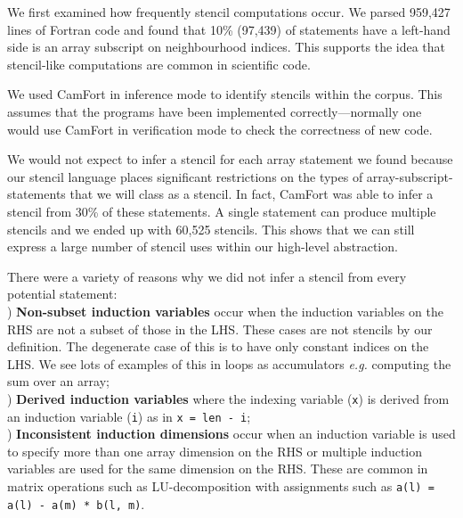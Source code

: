 \documentclass[10pt,preprint,numbers]{sigplanconf}
\theoremstyle{definition}
\newcommand{\eg}{\emph{e.g.}}
\begin{document}
We first examined how frequently stencil computations occur. We parsed
959,427 lines of Fortran code and found that 10\% (97,439) of
statements have a left-hand side is an array subscript on
neighbourhood indices. This supports the idea that stencil-like
computations are common in scientific code.

We used CamFort in inference mode to identify stencils within the
corpus. This assumes that the programs have been implemented
correctly---normally one would use CamFort in verification mode to
check the correctness of new code.

We would not expect to infer a stencil for each array statement we
found because our stencil language places significant restrictions on
the types of array-subscript-statements that we will class as a
stencil. In fact, CamFort was able to infer a stencil from 30\% of
these statements. A single statement can produce multiple stencils and
we ended up with 60,525 stencils. This shows that we can still express
a large number of stencil uses within our high-level abstraction.

There were a variety of reasons why we did not infer a
stencil from every potential statement: \\
) \textbf{Non-subset induction variables} occur when the
induction variables on the RHS are not a subset of those in the LHS. These
cases are not stencils by our definition. The degenerate case of this
is to have only constant indices on the LHS. We see lots of examples
of this in loops as accumulators \eg{} computing the sum over an array; \\
) \textbf{Derived induction variables} where the
indexing variable (\texttt{x}) is derived from an
induction variable (\texttt{i}) as in
\texttt{x = len - i};  \\
) \textbf{Inconsistent induction dimensions} occur when
an induction variable is used to specify more than one array dimension
on the RHS or multiple induction variables are used for the same
dimension on the RHS. These are common in matrix operations such as
LU-decomposition with assignments such as
\texttt{a(l) = a(l) - a(m) * b(l, m)}.


\end{document}
